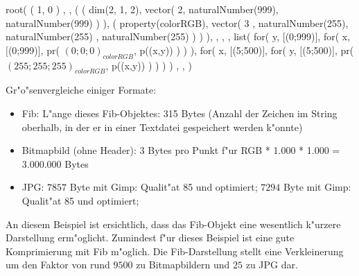 \begin{flushleft}
root( ( 1, 0 ) , , ( ( dim(2, 1, 2), vector( 2, naturalNumber(999), naturalNumber(999) ) ), ( property(colorRGB), vector( 3 , naturalNumber(255), naturalNumber(255) , naturalNumber(255) ) ) ), , , , list( for( y, $[$(0;999)$]$, for( x, $[$(0;999)$]$, pr( $(0;0;0)_{colorRGB}$, p((x,y)) ) ) ), for( x, $[$(5;500)$]$, for( y, $[$(5;500)$]$,  pr( $(255;255;255)_{colorRGB}$, p((x,y)) ) ) ) ) , , )


\bigskip\noindent
Gr"o"senvergleiche einiger Formate:
\begin{itemize}
 \item Fib: L"ange dieses Fib-Objektes: 315 Bytes (Anzahl der Zeichen im String oberhalb, in der er in einer Textdatei gespeichert werden k"onnte)
 \item Bitmapbild (ohne Header): 3 Bytes pro Punkt f"ur RGB * 1.000 * 1.000 = 3.000.000 Bytes
 \item JPG: $7857$ Byte mit Gimp: Qualit"at 85 und optimiert; $7294$ Byte mit Gimp: Qualit"at 85 und optimiert;
\end{itemize}

\end{flushleft}

\noindent
An diesem Beispiel ist ersichtlich, dass das Fib-Objekt eine wesentlich k"urzere Darstellung erm"oglicht.
Zumindest f"ur dieses Beispiel ist eine gute Komprimierung mit Fib m"oglich. Die Fib-Darstellung stellt eine Verkleinerung um den Faktor von rund $9500$ zu Bitmapbildern und $25$ zu JPG dar.

